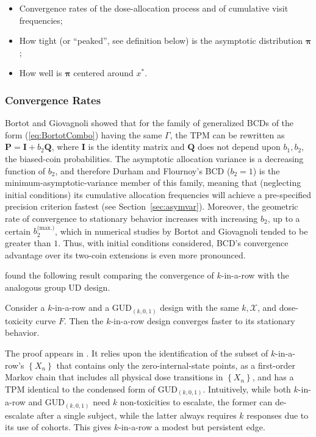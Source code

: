 \begin{itemize}
\item Convergence rates of the dose-allocation process and of cumulative visit frequencies;
\item How tight (or ``peaked'', see definition below) is the asymptotic distribution $\boldsymbol{\pi}$;
\item How well is $\boldsymbol{\pi}$ centered around $x^*$.
\end{itemize}

\subsubsection{Convergence Rates}

Bortot and Giovagnoli showed that for the family of generalized BCDs of the form (\ref{eq:BortotCombo}) having the same $\Gamma$, the TPM can be rewritten as $\mathbf{P}=\mathbf{I}+b_2\mathbf{Q}$, where $\mathbf{I}$ is the identity matrix and $\mathbf{Q}$ does not depend upon $b_1,b_2$, the biased-coin probabilities. The asymptotic allocation variance is a decreasing function of $b_2$, and therefore Durham and Flournoy's BCD ($b_2=1$) is the minimum-asymptotic-variance member of this family, meaning that (neglecting initial conditions) its cumulative allocation frequencies will achieve a pre-specified precision criterion fastest (see Section~\ref{sec:asymvar}). Moreover, the geometric rate of convergence to stationary behavior increases with increasing $b_2$, up to a certain $b_2^\textrm{(max.)}$, which in numerical studies by Bortot and Giovagnoli tended to be greater than $1$. Thus, with initial conditions considered, BCD's convergence advantage over its two-coin extensions is even more pronounced.

\cite{Oron:Hoff:thek:2009} found the following result comparing the convergence of $k$-in-a-row with the analogous group UD design.

\begin{thm}\label{thm:krgudconv} Consider a $k$-in-a-row and a GUD$_{(k,0,1)}$ design with the same $k,\mathcal{X}$, and dose-toxicity curve $F$. Then the $k$-in-a-row design converges faster to its stationary behavior.\end{thm}

\noindent The  proof appears in \cite{Oron:Hoff:thek:2009}. It relies upon the identification of the subset of $k$-in-a-row's $\left\{X_n\right\}$ that contains only the zero-internal-state points, as a first-order Markov chain that includes all physical dose transitions in $\left\{X_n\right\}$, and has a TPM identical to the condensed form of GUD$_{(k,0,1)}$. Intuitively, while both $k$-in-a-row and GUD$_{(k,0,1)}$ need $k$ non-toxicities to escalate, the former can de-escalate after a single subject, while the latter always requires $k$ responses due to its use of cohorts. This gives  $k$-in-a-row a modest but persistent edge.

